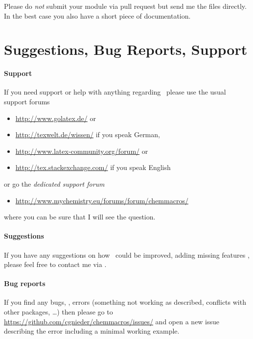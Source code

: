 \documentclass{chemmacros-manual}
\begin{document}
Please do \emph{not} submit your module via pull request but send me the files
directly.  In the best case you also have a short piece of documentation.

\section{Suggestions, Bug Reports, Support}\label{sec:sugg-bug-reports}

\paragraph{Support}
If you need support or help with anything regarding \chemmacros\ please use
the usual support forums
\begin{itemize}
  \item \url{http://www.golatex.de/} or
  \item \url{http://texwelt.de/wissen/} if you speak German,
  \item \url{http://www.latex-community.org/forum/} or
  \item \url{http://tex.stackexchange.com/} if you speak English
\end{itemize}
or go the \emph{dedicated support forum}
\begin{itemize}
  \item \url{http://www.mychemistry.eu/forums/forum/chemmacros/}
\end{itemize}
where you can be sure that I will see the question.
  
\paragraph{Suggestions}
If you have any suggestions on how \chemmacros\ could be improved, adding
missing features \etc, please feel free to contact me via
.

\paragraph{Bug reports}
If you find any bugs, \ie, errors (something not working as described,
conflicts with other packages, \ldots) then please go to
\url{https://github.com/cgnieder/chemmacros/issues/} and open a new issue
describing the error including a minimal working example.

\printbibliography
\end{document}
